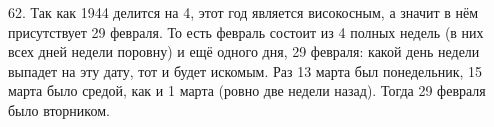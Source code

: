 62. Так как 1944 делится на 4, этот год является високосным, а значит в нём присутствует 29 февраля. То есть февраль состоит из 4 полных недель (в них всех дней недели поровну) и ещё одного дня, 29 февраля: какой день недели выпадет на эту дату, тот и будет искомым. Раз 13 марта был понедельник, 15 марта было средой, как и 1 марта (ровно две недели назад). Тогда 29 февраля было вторником.\\

